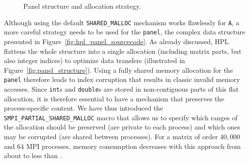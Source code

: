 \begin{figure}[htbp]
{\begin{minipage}{1.0\linewidth}
{\begin{minipage}[b]{\linewidth}
                \end{minipage}%
            }%
            \end{minipage}}%
            \caption{Panel structure and allocation strategy.\label{fig:panel}}\vspace{-1em}
        \end{figure}

        Although using the default \texttt{SHARED\_MALLOC} mechanism works flawlessly for \texttt{A}, a more careful
        strategy needs to be used for the \texttt{panel}, the complex data structure presented in
        Figure~\ref{fig:hpl_panel_sourcecode}. As already discussed, HPL flattens the whole structure  into a single
        allocation (including matrix parts, but also integer indices) to optimize data transfers (illustrated in
        Figure~\ref{fig:panel_structure}). Using a fully shared memory
        allocation for the \texttt{panel} therefore leads to index corruption that results in classic invalid memory
        accesses. Since \texttt{int}s and \texttt{double}s are stored in non-contiguous parts of this flat allocation,
        it is therefore essential to have a mechanism that preserves the process-specific content. We have thus
        introduced the \texttt{SMPI\_PARTIAL\_SHARED\_MALLOC} macro that allows us to specify which ranges of the
        allocation should be preserved (\ie are private to each process) and which ones may be corrupted (\ie are shared
        between processes).  For a matrix of order \(40,000\) and \(64\) MPI processes, memory consumption decreases
        with this approach from about  to less than .

